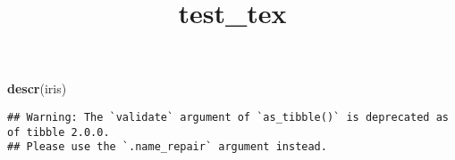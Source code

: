 \documentclass[
]{article}
\title{test\_tex}
\author{}
\date{\vspace{-2.5em}}
\newenvironment{Shaded}{\begin{snugshade}}{\end{snugshade}}
\newcommand{\KeywordTok}[1]{\textcolor[rgb]{0.13,0.29,0.53}{\textbf{#1}}}
\newcommand{\NormalTok}[1]{#1}
\begin{document}
\maketitle

{
\setcounter{tocdepth}{2}
\tableofcontents
}
\begin{Shaded}
\begin{Highlighting}[]
\KeywordTok{descr}\NormalTok{(iris)}
\end{Highlighting}
\end{Shaded}

\begin{verbatim}
## Warning: The `validate` argument of `as_tibble()` is deprecated as of tibble 2.0.0.
## Please use the `.name_repair` argument instead.
\end{verbatim}

\needspace{2cm}
\end{document}
